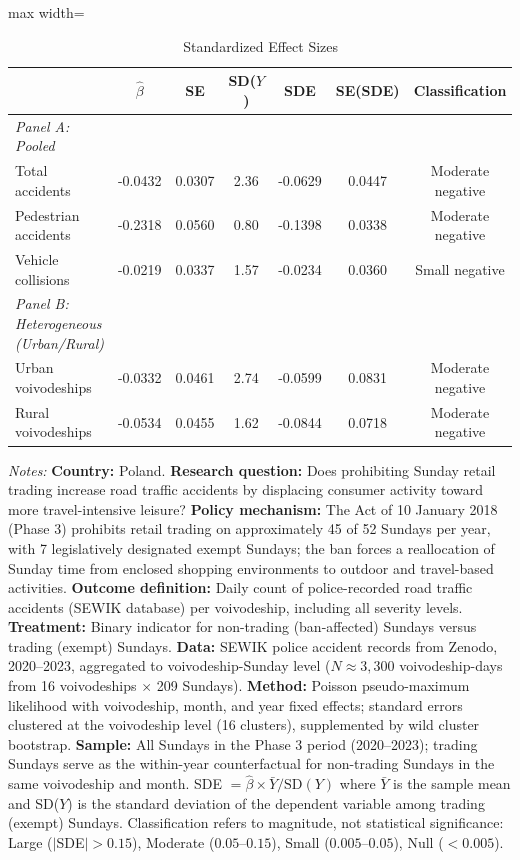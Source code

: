 \begin{table}[htbp]
\centering
\caption{Standardized Effect Sizes}
\label{tab:sde}
\begin{adjustbox}{max width=\textwidth}
\begin{tabular}{lcccccc}
\hline\hline
 & $\hat{\beta}$ & SE & SD($Y$) & SDE & SE(SDE) & Classification \\
\hline
\emph{Panel A: Pooled} & & & & & & \\
  Total accidents & -0.0432 & 0.0307 & 2.36 & -0.0629 & 0.0447 & Moderate negative \\
  Pedestrian accidents & -0.2318 & 0.0560 & 0.80 & -0.1398 & 0.0338 & Moderate negative \\
  Vehicle collisions & -0.0219 & 0.0337 & 1.57 & -0.0234 & 0.0360 & Small negative \\
\hline
\emph{Panel B: Heterogeneous (Urban/Rural)} & & & & & & \\
  Urban voivodeships & -0.0332 & 0.0461 & 2.74 & -0.0599 & 0.0831 & Moderate negative \\
  Rural voivodeships & -0.0534 & 0.0455 & 1.62 & -0.0844 & 0.0718 & Moderate negative \\
\hline\hline
\end{tabular}
\end{adjustbox}
\begin{tablenotes}[flushleft]
\footnotesize
\item \textit{Notes:} \textbf{Country:} Poland. \textbf{Research question:} Does prohibiting Sunday retail trading increase road traffic accidents by displacing consumer activity toward more travel-intensive leisure? \textbf{Policy mechanism:} The Act of 10 January 2018 (Phase 3) prohibits retail trading on approximately 45 of 52 Sundays per year, with 7 legislatively designated exempt Sundays; the ban forces a reallocation of Sunday time from enclosed shopping environments to outdoor and travel-based activities. \textbf{Outcome definition:} Daily count of police-recorded road traffic accidents (SEWIK database) per voivodeship, including all severity levels. \textbf{Treatment:} Binary indicator for non-trading (ban-affected) Sundays versus trading (exempt) Sundays. \textbf{Data:} SEWIK police accident records from Zenodo, 2020--2023, aggregated to voivodeship-Sunday level ($N \approx 3{,}300$ voivodeship-days from 16 voivodeships $\times$ 209 Sundays). \textbf{Method:} Poisson pseudo-maximum likelihood with voivodeship, month, and year fixed effects; standard errors clustered at the voivodeship level (16 clusters), supplemented by wild cluster bootstrap. \textbf{Sample:} All Sundays in the Phase 3 period (2020--2023); trading Sundays serve as the within-year counterfactual for non-trading Sundays in the same voivodeship and month. SDE $= \hat{\beta} \times \bar{Y} / \text{SD}(Y)$ where $\bar{Y}$ is the sample mean and SD($Y$) is the standard deviation of the dependent variable among trading (exempt) Sundays. Classification refers to magnitude, not statistical significance: Large ($|$SDE$| > 0.15$), Moderate ($0.05$--$0.15$), Small ($0.005$--$0.05$), Null ($< 0.005$).
\end{tablenotes}
\end{table}

